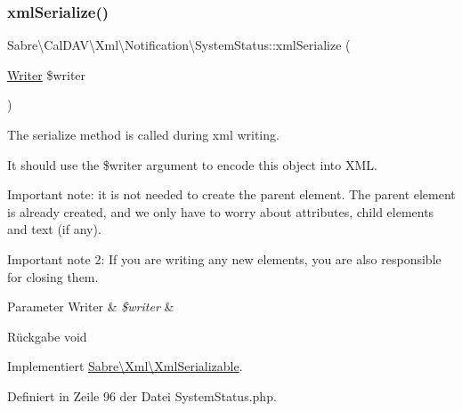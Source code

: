 \subsubsection{\texorpdfstring{xml\+Serialize()}{xmlSerialize()}}
{\footnotesize\ttfamily Sabre\textbackslash{}\+Cal\+D\+A\+V\textbackslash{}\+Xml\textbackslash{}\+Notification\textbackslash{}\+System\+Status\+::xml\+Serialize (\begin{DoxyParamCaption}\item[{\mbox{\hyperlink{class_sabre_1_1_xml_1_1_writer}{Writer}}}]{\$writer }\end{DoxyParamCaption})}

The serialize method is called during xml writing.

It should use the \$writer argument to encode this object into X\+ML.

Important note\+: it is not needed to create the parent element. The parent element is already created, and we only have to worry about attributes, child elements and text (if any).

Important note 2\+: If you are writing any new elements, you are also responsible for closing them.


\begin{DoxyParams}[1]{Parameter}
Writer & {\em \$writer} & \\
\hline
\end{DoxyParams}
\begin{DoxyReturn}{Rückgabe}
void 
\end{DoxyReturn}


Implementiert \mbox{\hyperlink{interface_sabre_1_1_xml_1_1_xml_serializable_aa78f3ee43aa699be8347181653a53d8c}{Sabre\textbackslash{}\+Xml\textbackslash{}\+Xml\+Serializable}}.



Definiert in Zeile 96 der Datei System\+Status.\+php.

\mbox{\label{class_sabre_1_1_cal_d_a_v_1_1_xml_1_1_notification_1_1_system_status_a8b76f8c950f79690bafb0d7bc7069e6e}} 
